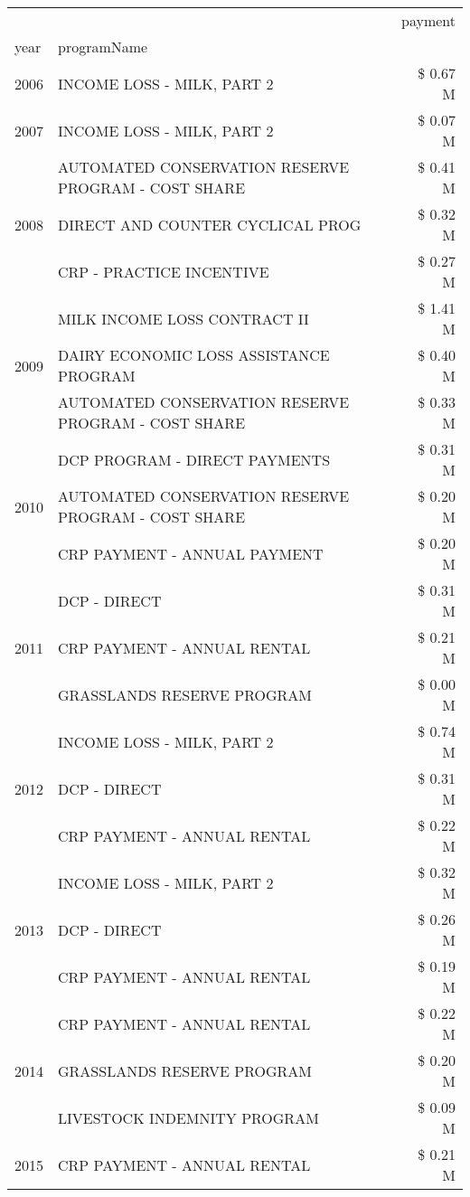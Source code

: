 \begin{tabular}{llr}
\toprule
 &  & payment \\
year & programName &  \\
\midrule
2006 & INCOME LOSS - MILK, PART 2 & \$ 0.67 M \\
\cline{1-3}
2007 & INCOME LOSS - MILK, PART 2 & \$ 0.07 M \\
\cline{1-3}
\multirow[t]{3}{*}{2008} & AUTOMATED CONSERVATION RESERVE PROGRAM - COST SHARE & \$ 0.41 M \\
 & DIRECT AND COUNTER CYCLICAL PROG & \$ 0.32 M \\
 & CRP - PRACTICE INCENTIVE & \$ 0.27 M \\
\cline{1-3}
\multirow[t]{3}{*}{2009} & MILK INCOME LOSS CONTRACT II & \$ 1.41 M \\
 & DAIRY ECONOMIC LOSS ASSISTANCE PROGRAM & \$ 0.40 M \\
 & AUTOMATED CONSERVATION RESERVE PROGRAM - COST SHARE & \$ 0.33 M \\
\cline{1-3}
\multirow[t]{3}{*}{2010} & DCP PROGRAM - DIRECT PAYMENTS & \$ 0.31 M \\
 & AUTOMATED CONSERVATION RESERVE PROGRAM - COST SHARE & \$ 0.20 M \\
 & CRP PAYMENT - ANNUAL PAYMENT & \$ 0.20 M \\
\cline{1-3}
\multirow[t]{3}{*}{2011} & DCP - DIRECT & \$ 0.31 M \\
 & CRP PAYMENT - ANNUAL RENTAL & \$ 0.21 M \\
 & GRASSLANDS RESERVE PROGRAM & \$ 0.00 M \\
\cline{1-3}
\multirow[t]{3}{*}{2012} & INCOME LOSS - MILK, PART 2 & \$ 0.74 M \\
 & DCP - DIRECT & \$ 0.31 M \\
 & CRP PAYMENT - ANNUAL RENTAL & \$ 0.22 M \\
\cline{1-3}
\multirow[t]{3}{*}{2013} & INCOME LOSS - MILK, PART 2 & \$ 0.32 M \\
 & DCP - DIRECT & \$ 0.26 M \\
 & CRP PAYMENT - ANNUAL RENTAL & \$ 0.19 M \\
\cline{1-3}
\multirow[t]{3}{*}{2014} & CRP PAYMENT - ANNUAL RENTAL & \$ 0.22 M \\
 & GRASSLANDS RESERVE PROGRAM & \$ 0.20 M \\
 & LIVESTOCK INDEMNITY PROGRAM & \$ 0.09 M \\
\cline{1-3}
\multirow[t]{3}{*}{2015} & CRP PAYMENT - ANNUAL RENTAL & \$ 0.21 M \\

\end{tabular}
